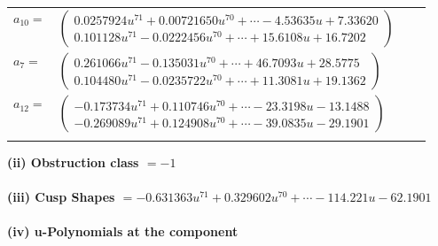 \documentclass[1p]{elsarticle_modified}
\theoremstyle{definition}
\begin{document}
\begin{tabular}{m{7pt} m{180pt} m{7pt} m{180pt} }
\flushright $a_{10}=$&$\begin{pmatrix}0.0257924 u^{71}+0.00721650 u^{70}+\cdots-4.53635 u+7.33620\\0.101128 u^{71}-0.0222456 u^{70}+\cdots+15.6108 u+16.7202\end{pmatrix}$ \\
\flushright $a_{7}=$&$\begin{pmatrix}0.261066 u^{71}-0.135031 u^{70}+\cdots+46.7093 u+28.5775\\0.104480 u^{71}-0.0235722 u^{70}+\cdots+11.3081 u+19.1362\end{pmatrix}$ \\
\flushright $a_{12}=$&$\begin{pmatrix}-0.173734 u^{71}+0.110746 u^{70}+\cdots-23.3198 u-13.1488\\-0.269089 u^{71}+0.124908 u^{70}+\cdots-39.0835 u-29.1901\end{pmatrix}$\\&\end{tabular}
\flushleft \textbf{(ii) Obstruction class $= -1$}\\~\\
\flushleft \textbf{(iii) Cusp Shapes $= -0.631363 u^{71}+0.329602 u^{70}+\cdots-114.221 u-62.1901$}\\~\\
\newpage\renewcommand{\arraystretch}{1}
\flushleft \textbf{(iv) u-Polynomials at the component}\newline \\
\end{document}
